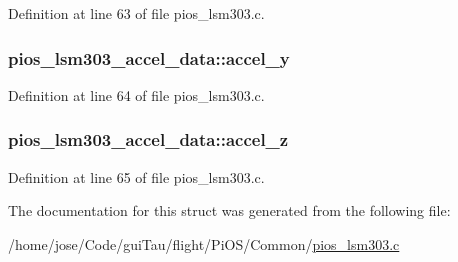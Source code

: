 Definition at line 63 of file pios\-\_\-lsm303.\-c.

\hypertarget{structpios__lsm303__accel__data_a7ffd1885ce614cf3163ee96ef56ace76}{
\subsubsection[{accel\-\_\-y}]{ pios\-\_\-lsm303\-\_\-accel\-\_\-data\-::accel\-\_\-y}}\label{structpios__lsm303__accel__data_a7ffd1885ce614cf3163ee96ef56ace76}


Definition at line 64 of file pios\-\_\-lsm303.\-c.

\hypertarget{structpios__lsm303__accel__data_a426a988b03d546ea4036551041bf00d1}{
\subsubsection[{accel\-\_\-z}]{ pios\-\_\-lsm303\-\_\-accel\-\_\-data\-::accel\-\_\-z}}\label{structpios__lsm303__accel__data_a426a988b03d546ea4036551041bf00d1}


Definition at line 65 of file pios\-\_\-lsm303.\-c.



The documentation for this struct was generated from the following file\-:\begin{DoxyCompactItemize}
\item 
/home/jose/\-Code/gui\-Tau/flight/\-Pi\-O\-S/\-Common/\hyperlink{pios__lsm303_8c}{pios\-\_\-lsm303.\-c}\end{DoxyCompactItemize}
